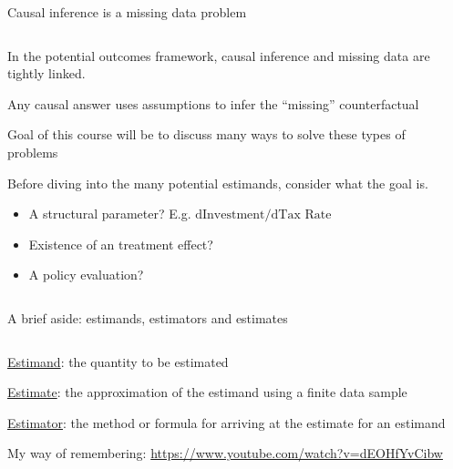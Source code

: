 \documentclass[notes,11pt, aspectratio=169]{beamer}
\newenvironment{wideitemize}{\itemize\addtolength{\itemsep}{10pt}}{\enditemize}
\begin{document}
\begin{frame}{Causal inference is a missing data problem}
\begin{columns}[T] %
\begin{column}{.65\textwidth}
  \begin{wideitemize}
  \item In the potential outcomes framework, causal inference and missing data are tightly linked.
  \item Any causal answer uses assumptions to infer the ``missing'' counterfactual 
  \item Goal of this course will be to discuss many ways to solve
    these types of problems
  \item Before diving into the many potential estimands, consider what
    the goal is.
    \begin{itemize}
    \item A structural parameter? E.g. $\text{dInvestment}/\text{dTax Rate}$
    \item Existence of an treatment effect?
    \item A policy evaluation?
    \end{itemize}
  \end{wideitemize}
\end{column}%
\hfill%
\begin{column}{.38\textwidth}

  \vspace{20pt}
  
  \vspace{20pt}
  
\end{column}%
\end{columns}
\end{frame}

\begin{frame}{A brief aside: estimands, estimators and estimates}
\begin{columns}[T] %
\begin{column}{.65\textwidth}
  \begin{wideitemize}
  \item \underline{Estimand}: the quantity to be estimated
  \item \underline{Estimate}: the approximation of the estimand using a finite data sample
  \item \underline{Estimator}: the method or formula for arriving at the estimate for an estimand
  \item My way of remembering: \url{https://www.youtube.com/watch?v=dEOHfYvCibw}
  \end{wideitemize}
\end{column}%
\hfill%
\begin{column}{.38\textwidth}

  \vspace{20pt}
  
  \vspace{20pt}
  
\end{column}%
\end{columns}
\end{frame}
\end{document}
